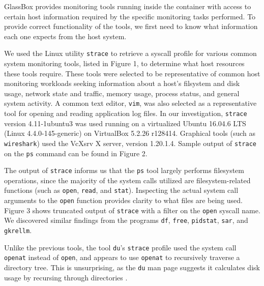 \documentclass{proc}
\begin{document}
GlassBox provides monitoring tools running inside the container with access to certain host information required by the specific monitoring tasks performed. To provide correct functionality of the tools, we first need to know what information each one expects from the host system.

We used the Linux utility \texttt{strace} to retrieve a syscall profile for various common system monitoring tools, listed in Figure 1, to determine what host resources these tools require. These tools were selected to be representative of common host monitoring workloads seeking information about a host's filsystem and disk usage, network state and traffic, memory usage, process status, and general system activity. A common text editor, \texttt{vim}, was also selected as a representative tool for opening and reading application log files. In our investigation, \texttt{strace} version 4.11-1ubuntu3 was used running on a virtualized Ubuntu 16.04.6 LTS (Linux 4.4.0-145-generic) on VirtualBox 5.2.26 r128414. Graphical tools (such as \texttt{wireshark}) used the VcXsrv X server, version 1.20.1.4. Sample output of \texttt{strace} on the \texttt{ps} command can be found in Figure 2.

The output of \texttt{strace} informs us that the \texttt{ps} tool largely performs filesystem operations, since the majority of the system calls utilized are filesystem-related functions (such as \texttt{open}, \texttt{read}, and \texttt{stat}). Inspecting the actual system call arguments to the \texttt{open} function provides clarity to what files are being used. Figure 3 shows truncated output of \texttt{strace} with a filter on the \texttt{open} syscall name. We discovered similar findings from the programs \texttt{df}, \texttt{free}, \texttt{pidstat}, \texttt{sar}, and \texttt{gkrellm}.

Unlike the previous tools, the tool \texttt{du}'s \texttt{strace} profile used the system call \texttt{openat} instead of \texttt{open}, and appears to use \texttt{openat} to recursively traverse a directory tree. This is unsurprising, as the \texttt{du} man page suggests it calculates disk usage by recursing through directories \cite{duman}.
\end{document}
